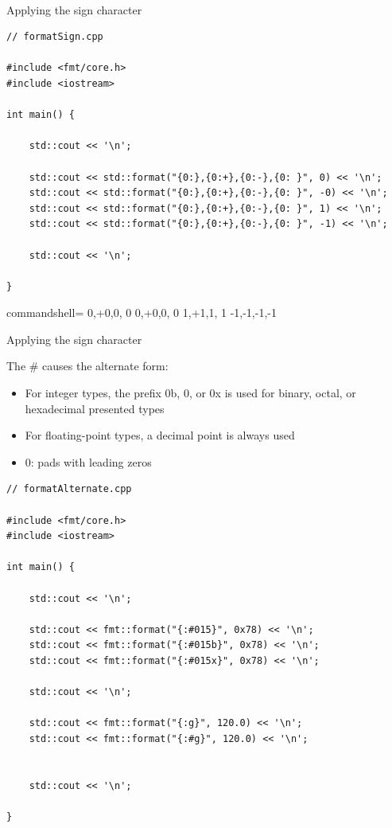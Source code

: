 \hspace*{\fill} \\ %
\noindent
Applying the sign character
\begin{lstlisting}[style=styleCXX]
// formatSign.cpp

#include <fmt/core.h>
#include <iostream>

int main() {
	
	std::cout << '\n';
	
	std::cout << std::format("{0:},{0:+},{0:-},{0: }", 0) << '\n';
	std::cout << std::format("{0:},{0:+},{0:-},{0: }", -0) << '\n';
	std::cout << std::format("{0:},{0:+},{0:-},{0: }", 1) << '\n';
	std::cout << std::format("{0:},{0:+},{0:-},{0: }", -1) << '\n';
	
	std::cout << '\n';
	
}
\end{lstlisting}

\begin{tcblisting}{commandshell={}}
0,+0,0, 0
0,+0,0, 0
1,+1,1, 1
-1,-1,-1,-1
\end{tcblisting}

\begin{center}
Applying the sign character
\end{center}

The \# causes the alternate form:

\begin{itemize}
\item 
For integer types, the prefix 0b, 0, or 0x is used for binary, octal, or hexadecimal presented types

\item 
For floating-point types, a decimal point is always used

\item 
0: pads with leading zeros
\end{itemize}

\begin{lstlisting}[style=styleCXX]
// formatAlternate.cpp

#include <fmt/core.h>
#include <iostream>

int main() {

	std::cout << '\n';
	
	std::cout << fmt::format("{:#015}", 0x78) << '\n';
	std::cout << fmt::format("{:#015b}", 0x78) << '\n';
	std::cout << fmt::format("{:#015x}", 0x78) << '\n';
	
	std::cout << '\n';
	
	std::cout << fmt::format("{:g}", 120.0) << '\n';
	std::cout << fmt::format("{:#g}", 120.0) << '\n';
	
	
	std::cout << '\n';

}
\end{lstlisting}

